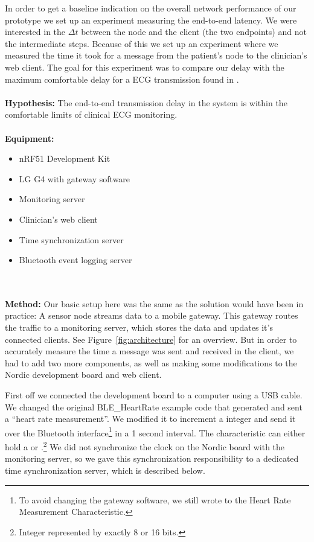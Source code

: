 In order to get a baseline indication on the overall network performance of our prototype we set up an experiment measuring the end-to-end latency. We were interested in the $\Delta t$ between the node and the client (the two endpoints) and not the intermediate steps. Because of this we set up an experiment where we measured the time it took for a message from the patient's node to the clinician's web client. The goal for this experiment was to compare our delay with the maximum comfortable delay for a ECG transmission found in \cite{Alesanco:2010kc}.
\\
\\
\noindent
\textbf{Hypothesis:} The end-to-end transmission delay in the system is within the comfortable limits of clinical ECG monitoring.
\\
\\
\noindent
\textbf{Equipment:} 
\begin{itemize}

  \item nRF51 Development Kit
  
  \item LG G4 with gateway software
  
  \item Monitoring server
  
  \item Clinician's web client 
  
  \item Time synchronization server

  \item Bluetooth event logging server
  
\end{itemize}
\\
\\
\noindent
\textbf{Method:} Our basic setup here was the same as the solution would have been in practice: A sensor node streams data to a mobile gateway. This gateway routes the traffic to a monitoring server, which stores the data and updates it's connected clients. See Figure~\ref{fig:architecture} for an overview. But in order to accurately measure the time a message was sent and received in the client, we had to add two more components, as well as making some modifications to the Nordic development board and web client.

First off we connected the development board to a computer using a USB cable. We changed the original BLE\_HeartRate example code that generated and sent a ``heart rate measurement''. We modified it to increment a  integer and send it over the Bluetooth interface\footnote{ To avoid changing the gateway software, we still wrote to the Heart Rate Measurement Characteristic.} in a 1 second interval. The characteristic can either hold a  or .\footnote{ Integer represented by exactly 8 or 16 bits.} We did not synchronize the clock on the Nordic board with the monitoring server, so we gave this synchronization responsibility to a dedicated time synchronization server, which is described below.

